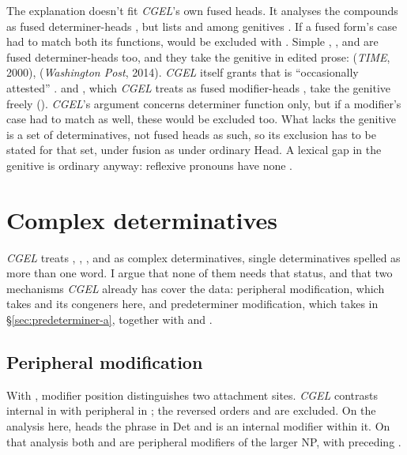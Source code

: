 \documentclass[12pt]{article}
\begin{document}
The explanation doesn't fit \textit{CGEL}'s own fused heads. It analyses the compounds as fused determiner-heads \citep[423]{huddleston2002}, but lists  and  among genitives \citep[479]{huddleston2002}. If a fused form's case had to match both its functions,  would be excluded with . Simple , , and  are fused determiner-heads too, and they take the genitive in edited prose:  (\textit{TIME}, 2000),  (\textit{Washington Post}, 2014). \textit{CGEL} itself grants that  is \enquote{occasionally attested} \citep[420]{huddleston2002}.  and , which \textit{CGEL} treats as fused modifier-heads \citep[416]{huddleston2002}, take the genitive freely (). \textit{CGEL}'s argument concerns determiner function only, but if a modifier's case had to match as well, these would be excluded too. What lacks the genitive is a set of determinatives, not fused heads as such, so its exclusion has to be stated for that set, under fusion as under ordinary Head. A lexical gap in the genitive is ordinary anyway: reflexive pronouns have none \citep[426]{huddleston2002}.

\section{Complex determinatives}\label{sec:complex}

\textit{CGEL} treats , , , and  as complex determinatives, single determinatives spelled as more than one word. I argue that none of them needs that status, and that two mechanisms \textit{CGEL} already has cover the data: peripheral modification, which takes  and its congeners here, and predeterminer modification, which takes  in §\ref{sec:predeterminer-a}, together with  and .

\subsection{Peripheral modification}\label{sec:complex-determinatives}
With , modifier position distinguishes two attachment sites. \textit{CGEL} contrasts internal  in  with peripheral  in  \citep[p.~392, (61)]{huddleston2002}; the reversed orders  and  are excluded. On the analysis here,  heads the phrase in Det and  is an internal modifier within it. On that analysis both  and  are peripheral modifiers of the larger NP, with  preceding .
\end{document}
